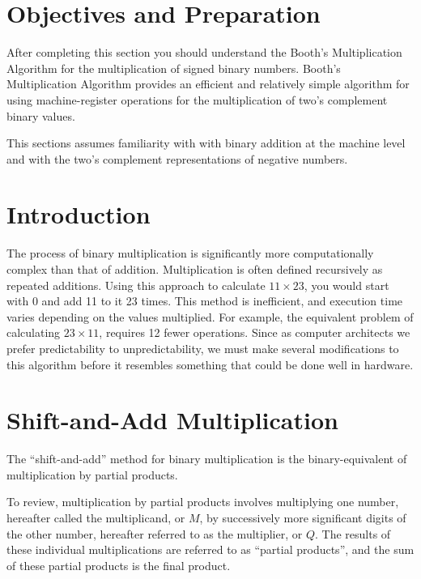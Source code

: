 \documentclass{article}
\begin{document}
\section{Objectives and Preparation}
After completing this section you should understand the Booth's Multiplication Algorithm for the multiplication of signed binary numbers.
Booth's Multiplication Algorithm provides an efficient and relatively simple algorithm for using machine-register operations for the multiplication of two's complement binary values.

This sections assumes familiarity with with binary addition at the machine level and with the two's complement representations of negative numbers.

\section{Introduction}
The process of binary multiplication is significantly more computationally complex than that of addition.
Multiplication is often defined recursively as repeated additions.
Using this approach to calculate $11 \times 23$, you would start with 0 and add 11 to it 23 times.
This method is inefficient, and execution time varies depending on the values multiplied.
For example, the equivalent problem of calculating $23 \times 11$, requires 12 fewer operations.
Since as computer architects we prefer predictability to unpredictability, we must make several modifications to this algorithm before it resembles something that could be done well in hardware.

\section{Shift-and-Add Multiplication}
The ``shift-and-add'' method for binary multiplication is the binary-equivalent of multiplication by partial products.

To review, multiplication by partial products involves multiplying one number, hereafter called the multiplicand, or $M$, by successively more significant digits of the other number, hereafter referred to as the multiplier, or $Q$.
The results of these individual multiplications are referred to as ``partial products'', and the sum of these partial products is the final product.
\end{document}
